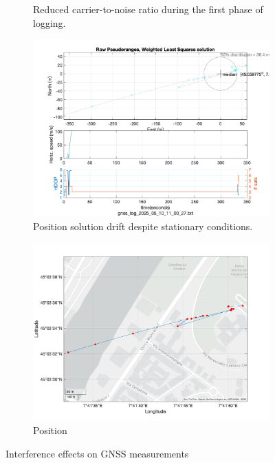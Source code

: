 \begin{figure}[h!]
\begin{subfigure}{0.23\textwidth}
                \caption{Reduced carrier-to-noise ratio during the first phase of logging.}
                \label{fig:interference_cno}
            \end{subfigure}
            \hfill
            \begin{subfigure}{0.22\textwidth}            
                \vspace{0.40cm}
                \includegraphics[width=\textwidth]{images/tests/Monte_Cappuccini/Interferences/Samsung_A51_Monte_Cappuccini_interference_fig4.png}
                \caption{Position solution drift despite stationary conditions.}
                \label{fig:interference_pos}
            \end{subfigure}
            \hfill
            \begin{subfigure}{0.23\textwidth}
                \vspace{0.40cm}
                \includegraphics[width=\textwidth]{images/tests/Monte_Cappuccini/Interferences/Samsung_A51_Monte_Cappuccini_interference_fig6.png}
                \caption{Position}
                \label{fig:interference_pos}
            \end{subfigure}
            \vspace{0.35cm}
            \caption{Interference effects on GNSS measurements}
            \label{fig:interference_plots}
        \end{figure}

